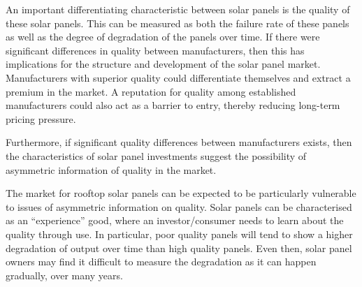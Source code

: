 \documentclass[12pt]{article}
\begin{document}
An important differentiating characteristic between solar panels is the quality of these solar panels. This can be measured as both the failure rate of these panels as well as the degree of degradation of the panels over time. If there were significant differences in quality between manufacturers, then this has implications for the structure and development of the solar panel market. Manufacturers with superior quality could differentiate themselves and extract a premium in the market. A reputation for quality among established manufacturers could also act as a barrier to entry, thereby reducing long-term pricing pressure.

Furthermore, if significant quality differences between manufacturers exists, then the characteristics of solar panel investments suggest the possibility of asymmetric information of quality in the market.



The market for rooftop solar panels can be expected to be particularly vulnerable to issues of asymmetric information on quality. Solar panels can be characterised as an ``experience'' good, where an investor/consumer needs to learn about the quality through use. In particular, poor quality panels will tend to show a higher degradation of output over time than high quality panels. Even then, solar panel owners may find it difficult to measure the degradation as it can happen gradually, over many years.
\end{document}
